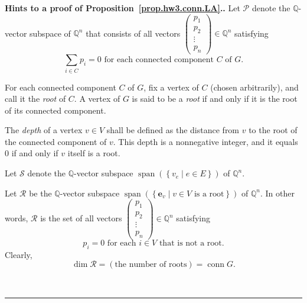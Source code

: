 \documentclass[numbers=enddot,12pt,final,onecolumn,notitlepage]{scrartcl}%
\theoremstyle{definition}
\newenvironment{proof}[1][Proof]{\noindent\textbf{#1.} }{\ \rule{0.5em}{0.5em}}
\let\sumnonlimits\sum
\renewcommand{\sum}{\sumnonlimits\limits}
\newcommand{\conn}{\operatorname{conn}}
\newcommand{\QQ}{\mathbb{Q}}
\newcommand{\set}[1]{\left\{ #1 \right\}}
\newcommand{\tup}[1]{\left( #1 \right)}
\newcommand{\spann}[1]{\operatorname{span}\left( #1 \right)}
\begin{document}
\begin{proof}[Hints to a proof of Proposition~\ref{prop.hw3.conn.LA}.]
Let $\mathcal{P}$ denote the $\QQ$-vector subspace of $\QQ^n$ that
consists of all vectors
$\left(
\begin{matrix} p_1 \\ p_2 \\ \vdots \\ p_n \end{matrix}
\right) \in \QQ^n$
satisfying
\begin{equation}
 \sum_{i \in C} p_i = 0
 \text{ for each connected component } C \text{ of } G .
\label{pf.prop.hw3.conn.LA.def-P}
\end{equation}

For each connected component $C$ of $G$, fix a vertex of $C$
(chosen arbitrarily), and call it the \textit{root} of $C$.
A vertex of $G$ is said to be a \textit{root} if and only if
it is the root of its connected component.

The \textit{depth} of a vertex $v \in V$ shall be defined as
the distance from $v$ to the root of the connected component
of $v$.
This depth is a nonnegative integer, and it equals $0$ if and
only if $v$ itself is a root.

Let $\mathcal{S}$ denote the $\QQ$-vector subspace
$\spann{\set{v_e \mid e \in E}}$ of $\QQ^n$.

Let $\mathcal{R}$ be the $\QQ$-vector subspace
$\spann{\set{\mathbf{e}_v \mid v \in V \text{ is a root}}}$
of $\QQ^n$.
In other words, $\mathcal{R}$ is the set of all vectors
$\left(
\begin{matrix} p_1 \\ p_2 \\ \vdots \\ p_n \end{matrix}
\right) \in \QQ^n$
satisfying
\begin{equation}
 p_i = 0
 \text{ for each } i \in V \text{ that is not a root}.
\label{pf.prop.hw3.conn.LA.def-R}
\end{equation}
Clearly,
\[
\dim \mathcal{R} = \tup{\text{the number of roots}}
= \conn G.
\]


\end{proof}
\end{document}
